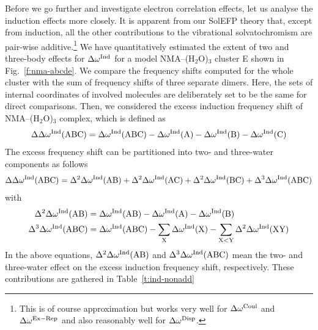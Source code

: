 \documentclass[a4paper,titlepage,twoside,fleqn,12pt]{book}
\begin{document}
\begin{refsection}
Before we go further and investigate electron correlation
effects, let us analyse the induction effects more closely.
It is apparent from our SolEFP theory that, except from induction, 
all the other contributions to the vibrational solvatochromism
are pair\hyp{}wise additive.\footnote{This is of course approximation
but works very well for $\Delta\omega^{\rm Coul}$ and $\Delta\omega^{\rm Ex-Rep}$
and also reasonably well for $\Delta\omega^{\rm Disp}$.} 
We have quantitatively estimated
the extent of two and three\hyp{}body effects for $\Delta\omega^{\rm Ind}$
for a model NMA--(H$_2$O)$_3$ cluster E shown in Fig.~\ref{f:nma-abcde}. 
We compare the frequency shifts computed for the whole cluster 
with the sum of frequency shifts of three
separate dimers. Here, the sets of internal coordinates of
involved molecules are deliberately set to be the same for
direct comparisons. Then, we considered the excess induction
frequency shift of NMA--(H$_2$O)$_3$
complex, which is defined as
%
\begin{equation}
\Delta\Delta\omega^{\rm Ind}(\text{ABC}) = \Delta\omega^{\rm Ind}(\text{ABC})
 - \Delta\omega^{\rm Ind}(\text{A}) - \Delta\omega^{\rm Ind}(\text{B}) - \Delta\omega^{\rm Ind}(\text{C})
\end{equation}
%
The excess frequency shift can be partitioned into two\hyp{} and three\hyp{}water components as follows 
%
\begin{equation}
\Delta\Delta\omega^{\rm Ind}(\text{ABC}) = 
\Delta^2\Delta\omega^{\rm Ind}(\text{AB}) +
\Delta^2\Delta\omega^{\rm Ind}(\text{AC}) +
\Delta^2\Delta\omega^{\rm Ind}(\text{BC}) +
\Delta^3\Delta\omega^{\rm Ind}(\text{ABC})
\end{equation}
%
with
%
\begin{subequations}
\begin{align}
\Delta^2\Delta\omega^{\rm Ind}(\text{AB}) &= 
   \Delta\omega^{\rm Ind}(\text{AB}) - 
   \Delta\omega^{\rm Ind}(\text{A})  -
   \Delta\omega^{\rm Ind}(\text{B}) \\
\Delta^3\Delta\omega^{\rm Ind}(\text{ABC})&=
   \Delta\omega^{\rm Ind}(\text{ABC}) -
\sum_\text{X} \Delta\omega^{\rm Ind}(\text{X}) -
\sum_{\text{X}<\text{Y}} \Delta^2\Delta\omega^{\rm Ind}(\text{XY})
\end{align}
\end{subequations}
%
In the above equations, $\Delta^2\Delta\omega^{\rm Ind}(\text{AB})$
and $\Delta^3\Delta\omega^{\rm Ind}(\text{ABC})$
mean the two\hyp{} and three\hyp{}water effect on the excess induction frequency shift,
respectively. These contributions are gathered in Table~\ref{t:ind-nonadd}

\end{refsection}
\end{document}
